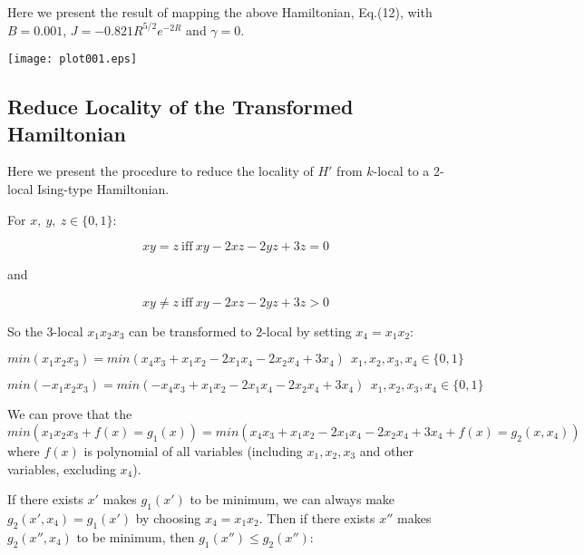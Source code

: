 \documentclass{article}
\begin{document}
Here we present the result of mapping the above Hamiltonian, Eq.(12), with $B=0.001$, $J=-0.821R^{5/2}e^{-2R}$ and $\gamma=0$\cite{huang2005entanglement}.

\begin{center}
\texttt{[image: plot001.eps]}


\end{center}

\subsection*{Reduce Locality of the Transformed Hamiltonian}

Here we present the procedure to reduce the locality of $H'$ from $k$-local to a 2-local Ising-type Hamiltonian.

For $x,\ y,\ z \in \{0,1\}$\cite{bian2013experimental}:

\begin{equation}
xy=z \ \text{iff} \ xy-2xz-2yz+3z=0
\end{equation}

and

\begin{equation}
xy\neq z\ \text{iff} \ xy-2xz-2yz+3z>0
\end{equation}

So the 3-local $x_1x_2x_3$ can be transformed to 2-local by setting $x_4=x_1x_2$:

\begin{equation}
min(x_1x_2x_3)=min(x_4x_3+x_1x_2-2x_1x_4-2x_2x_4+3x_4)\ \ x_1,x_2,x_3,x_4 \in \{0,1\}
\end{equation}

\begin{equation}
min(-x_1x_2x_3)=min(-x_4x_3+x_1x_2-2x_1x_4-2x_2x_4+3x_4)\
 \ x_1,x_2,x_3,x_4 \in \{0,1\}
\end{equation}

We can prove that the $ min(x_1x_2x_3+f(x)=g_1(x))=min(x_4x_3+x_1x_2-2x_1x_4-2x_2x_4+3x_4+f(x)=g_2(x,x_4))$ where $f(x)$ is polynomial of all variables (including $x_1,x_2,x_3$ and other variables, excluding $x_4$).

If there exists $x'$ makes $g_1(x')$ to be minimum, we can always make $g_2(x',x_4)=g_1(x')$ by choosing $x_4=x_1x_2$. Then if there exists $x''$ makes $g_2(x'',x_4)$ to be minimum, then $g_1(x'')\leq g_2(x'')$:
\end{document}
